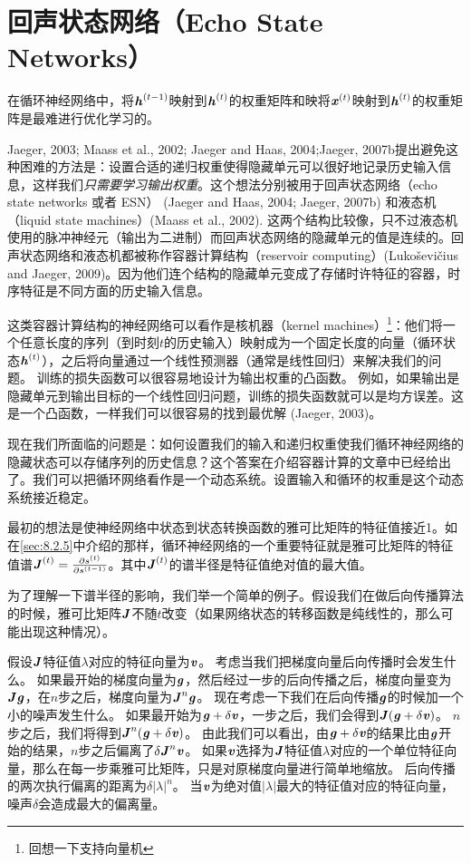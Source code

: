 \section{回声状态网络（Echo State Networks）}
\label{sec:10.8}
在循环神经网络中，将$\boldsymbol{\mathit{h}}^{(t-1)}$映射到$\boldsymbol{\mathit{h}}^{(t)}$的权重矩阵和映将$\boldsymbol{\mathit{x}}^{(t)}$映射到$\boldsymbol{\mathit{h}}^{(t)}$的权重矩阵是最难进行优化学习的。

Jaeger, 2003; Maass et al., 2002; Jaeger and Haas, 2004;Jaeger, 2007b提出避免这种困难的方法是：设置合适的递归权重使得隐藏单元可以很好地记录历史输入信息，这样我们\emph{只需要学习输出权重}。这个想法分别被用于回声状态网络（echo state networks 或者 ESN） (Jaeger and Haas, 2004; Jaeger, 2007b) 和液态机 （liquid state machines）(Maass et al., 2002). 这两个结构比较像，只不过液态机使用的脉冲神经元（输出为二进制）而回声状态网络的隐藏单元的值是连续的。回声状态网络和液态机都被称作容器计算结构（reservoir computing）(Lukoševičius and Jaeger, 2009)。因为他们连个结构的隐藏单元变成了存储时许特征的容器，时序特征是不同方面的历史输入信息。

这类容器计算结构的神经网络可以看作是核机器（kernel machines）\footnote{回想一下支持向量机}：他们将一个任意长度的序列（到时刻$t$的历史输入）映射成为一个固定长度的向量（循环状态$\boldsymbol{\mathit{h}}^{(t)}$），之后将向量通过一个线性预测器（通常是线性回归）来解决我们的问题。
训练的损失函数可以很容易地设计为输出权重的凸函数。
例如，如果输出是隐藏单元到输出目标的一个线性回归问题，训练的损失函数就可以是均方误差。这是一个凸函数，一样我们可以很容易的找到最优解 (Jaeger, 2003)。

现在我们所面临的问题是：如何设置我们的输入和递归权重使我们循环神经网络的隐藏状态可以存储序列的历史信息？这个答案在介绍容器计算的文章中已经给出了。我们可以把循环网络看作是一个动态系统。设置输入和循环的权重是这个动态系统接近稳定。

最初的想法是使神经网络中状态到状态转换函数的雅可比矩阵的特征值接近1。如在\ref{sec:8.2.5}中介绍的那样，循环神经网络的一个重要特征就是雅可比矩阵的特征值谱$\boldsymbol{\mathit{J}}^{(t)} = \frac{\partial s^{(t)}}{\partial s^{(t-1)}}$。其中$\boldsymbol{\mathit{J}}^{(t)}$的谱半径是特征值绝对值的最大值。

为了理解一下谱半径的影响，我们举一个简单的例子。假设我们在做后向传播算法的时候，雅可比矩阵$\boldsymbol{\mathit{J}}$不随$t$改变（如果网络状态的转移函数是纯线性的，那么可能出现这种情况）。

假设$\boldsymbol{\mathit{J}}$特征值$\lambda$对应的特征向量为$\boldsymbol{\mathit{v}}$。
考虑当我们把梯度向量后向传播时会发生什么。
如果最开始的梯度向量为$\boldsymbol{\mathit{g}}$，然后经过一步的后向传播之后，梯度向量变为$\boldsymbol{\mathit{J}} \boldsymbol{\mathit{g}}$，在$n$步之后，梯度向量为$\boldsymbol{\mathit{J}}^n \boldsymbol{\mathit{g}}$。
现在考虑一下我们在后向传播$\boldsymbol{\mathit{g}}$的时候加一个小的噪声发生什么。
如果最开始为$\boldsymbol{\mathit{g}} + \delta \boldsymbol{\mathit{v}}$，一步之后，我们会得到$\boldsymbol{\mathit{J}}(\boldsymbol{\mathit{g}} + \delta \boldsymbol{\mathit{v}})$。
$n$步之后，我们将得到$\boldsymbol{\mathit{J}}^n(\boldsymbol{\mathit{g}} + \delta \boldsymbol{\mathit{v}})$。
由此我们可以看出，由$\boldsymbol{\mathit{g}}+\delta \boldsymbol{\mathit{v}}$的结果比由$\boldsymbol{\mathit{g}}$开始的结果，$n$步之后偏离了$\delta \boldsymbol{\mathit{J}}^n \boldsymbol{\mathit{v}}$。
如果$\boldsymbol{\mathit{v}}$选择为$\boldsymbol{\mathit{J}}$特征值$\lambda$对应的一个单位特征向量，那么在每一步乘雅可比矩阵，只是对原梯度向量进行简单地缩放。
后向传播的两次执行偏离的距离为$\delta | \lambda |^n$。
当$\boldsymbol{\mathit{v}}$为绝对值$|\lambda|$最大的特征值对应的特征向量，噪声$\delta$会造成最大的偏离量。

